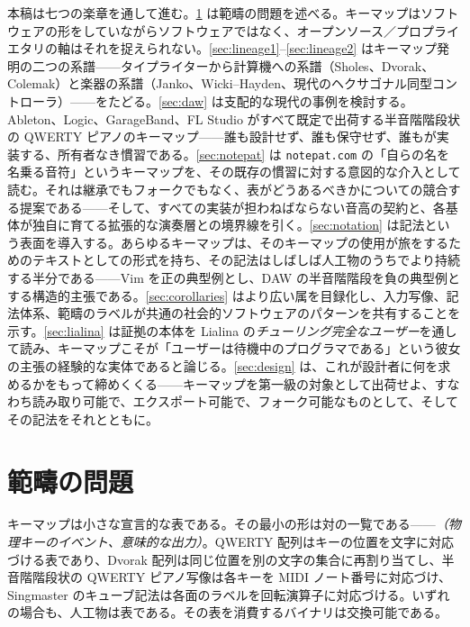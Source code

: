 \documentclass[10pt,letterpaper,twocolumn]{article}
\begin{document}
本稿は七つの楽章を通して進む。\textsection\ref{sec:category} は範疇の問題を述べる。キーマップはソフトウェアの形をしていながらソフトウェアではなく、オープンソース／プロプライエタリの軸はそれを捉えられない。\textsection\ref{sec:lineage1}--\ref{sec:lineage2} はキーマップ発明の二つの系譜——タイプライターから計算機への系譜（Sholes、Dvorak、Colemak）と楽器の系譜（Janko、Wicki--Hayden、現代のヘクサゴナル同型コントローラ）——をたどる。\textsection\ref{sec:daw} は支配的な現代の事例を検討する。Ableton、Logic、GarageBand、FL Studio がすべて既定で出荷する半音階階段状の QWERTY ピアノのキーマップ——誰も設計せず、誰も保守せず、誰もが実装する、所有者なき慣習である。\textsection\ref{sec:notepat} は \texttt{notepat.com} の「自らの名を名乗る音符」というキーマップを、その既存の慣習に対する意図的な介入として読む。それは継承でもフォークでもなく、表がどうあるべきかについての競合する提案である——そして、すべての実装が担わねばならない音高の契約と、各基体が独自に育てる拡張的な演奏層との境界線を引く。\textsection\ref{sec:notation} は記法という表面を導入する。あらゆるキーマップは、そのキーマップの使用が旅をするためのテキストとしての形式を持ち、その記法はしばしば人工物のうちでより持続する半分である——Vim を正の典型例とし、DAW の半音階階段を負の典型例とする構造的主張である。\textsection\ref{sec:corollaries} はより広い属を目録化し、入力写像、記法体系、範疇のラベルが共通の社会的ソフトウェアのパターンを共有することを示す。\textsection\ref{sec:lialina} は証拠の本体を Lialina の\emph{チューリング完全なユーザー}を通して読み、キーマップこそが「ユーザーは待機中のプログラマである」という彼女の主張の経験的な実体であると論じる。\textsection\ref{sec:design} は、これが設計者に何を求めるかをもって締めくくる——キーマップを第一級の対象として出荷せよ、すなわち読み取り可能で、エクスポート可能で、フォーク可能なものとして、そしてその記法をそれとともに。

\section{範疇の問題}
\label{sec:category}

キーマップは小さな宣言的な表である。その最小の形は対の一覧である——\emph{（物理キーのイベント、意味的な出力）}。QWERTY 配列はキーの位置を文字に対応づける表であり、Dvorak 配列は同じ位置を別の文字の集合に再割り当てし、半音階階段状の QWERTY ピアノ写像は各キーを MIDI ノート番号に対応づけ、Singmaster のキューブ記法は各面のラベルを回転演算子に対応づける。いずれの場合も、人工物は表である。その表を消費するバイナリは交換可能である。
\end{document}

